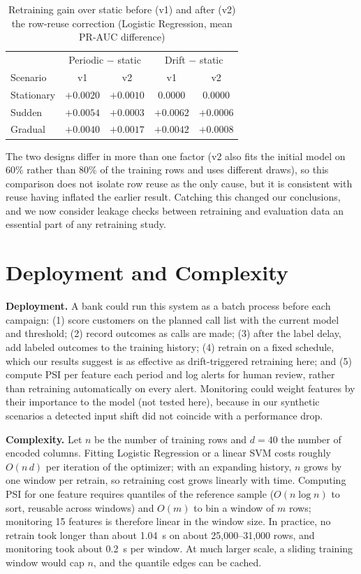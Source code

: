 \documentclass[conference]{IEEEtran}
\begin{document}
\begin{table}[t]
\caption{Retraining gain over static before (v1) and after (v2) the row-reuse correction (Logistic Regression, mean PR-AUC difference)}
\label{tab:v1v2}
\centering
\footnotesize
\begin{tabular}{@{}lcccc@{}}
\toprule
 & \multicolumn{2}{c}{Periodic $-$ static} & \multicolumn{2}{c}{Drift $-$ static} \\
Scenario & v1 & v2 & v1 & v2 \\
\midrule
Stationary & $+0.0020$ & $+0.0010$ & $0.0000$ & $0.0000$ \\
Sudden & $+0.0054$ & $+0.0003$ & $+0.0062$ & $+0.0006$ \\
Gradual & $+0.0040$ & $+0.0017$ & $+0.0042$ & $+0.0008$ \\
\bottomrule
\end{tabular}
\end{table} The two designs differ in more than one factor (v2 also fits the initial model on 60\% rather than 80\% of the training rows and uses different draws), so this comparison does not isolate row reuse as the only cause, but it is consistent with reuse having inflated the earlier result. Catching this changed our conclusions, and we now consider leakage checks between retraining and evaluation data an essential part of any retraining study.

\section{Deployment and Complexity}
\label{sec:deployment}

\textbf{Deployment.} A bank could run this system as a batch process before each campaign: (1) score customers on the planned call list with the current model and threshold; (2) record outcomes as calls are made; (3) after the label delay, add labeled outcomes to the training history; (4) retrain on a fixed schedule, which our results suggest is as effective as drift-triggered retraining here; and (5) compute PSI per feature each period and log alerts for human review, rather than retraining automatically on every alert. Monitoring could weight features by their importance to the model (not tested here), because in our synthetic scenarios a detected input shift did not coincide with a performance drop.

\textbf{Complexity.} Let $n$ be the number of training rows and $d = 40$ the number of encoded columns. Fitting Logistic Regression or a linear SVM costs roughly $O(n\,d)$ per iteration of the optimizer; with an expanding history, $n$ grows by one window per retrain, so retraining cost grows linearly with time. Computing PSI for one feature requires quantiles of the reference sample ($O(n \log n)$ to sort, reusable across windows) and $O(m)$ to bin a window of $m$ rows; monitoring 15 features is therefore linear in the window size. In practice, no retrain took longer than about 1.04~s on about 25,000--31,000 rows, and monitoring took about 0.2~s per window. At much larger scale, a sliding training window would cap $n$, and the quantile edges can be cached.
\end{document}
